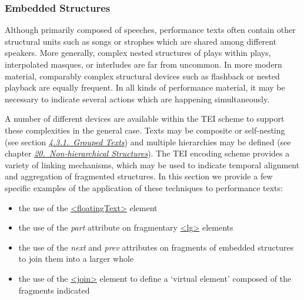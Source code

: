 \subsubsection[{Embedded Structures}]{Embedded Structures}\label{DREMB}\par
Although primarily composed of speeches, performance texts often contain other structural units such as songs or strophes which are shared among different speakers. More generally, complex nested structures of plays within plays, interpolated masques, or interludes are far from uncommon. In more modern material, comparably complex structural devices such as flashback or nested playback are equally frequent. In all kinds of performance material, it may be necessary to indicate several actions which are happening simultaneously.\par
A number of different devices are available within the TEI scheme to support these complexities in the general case. Texts may be composite or self-nesting (see section \textit{\hyperref[DSGRP]{4.3.1.\ Grouped Texts}}) and multiple hierarchies may be defined (see chapter \textit{\hyperref[NH]{20.\ Non-hierarchical Structures}}). The TEI encoding scheme provides a variety of linking mechanisms, which may be used to indicate temporal alignment and aggregation of fragmented structures. In this section we provide a few specific examples of the application of these techniques to performance texts: \begin{itemize}
\item the use of the \hyperref[TEI.floatingText]{<floatingText>} element
\item the use of the {\itshape part} attribute on fragmentary \hyperref[TEI.lg]{<lg>} elements
\item the use of the {\itshape next} and {\itshape prev} attributes on fragments of embedded structures to join them into a larger whole
\item the use of the \hyperref[TEI.join]{<join>} element to define a ‘virtual element’ composed of the fragments indicated
\end{itemize} \par
